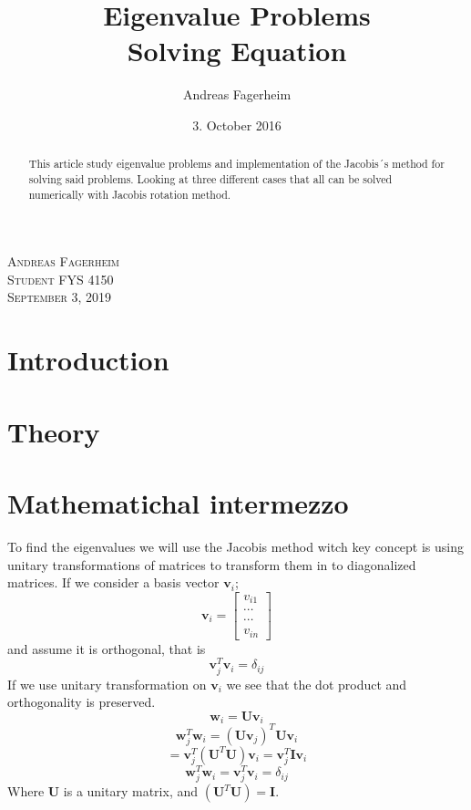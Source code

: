 \documentclass{article}
\title{Eigenvalue Problems \\
		Solving \SL Equation
		}
\author{Andreas Fagerheim}
\date{3. October 2016}
\begin{document}
\maketitle
	

\begin{abstract}
This article study eigenvalue problems and implementation of the Jacobis´s method for solving said problems. Looking at three different cases that all can be solved numerically with Jacobis rotation method.
\end{abstract}
\begin{flushright}
	\textsc{Andreas Fagerheim \\
	Student FYS 4150\\
	September 3, 2019}
	\end{flushright}

\cleardoublepage
\section{Introduction}



\section{Theory}\label{sec:theory}
\section{Mathematichal intermezzo}\label{sec:math}
To find the eigenvalues we will use the Jacobis method witch key concept is using unitary transformations of matrices to transform them in to diagonalized matrices. %
If we consider a basis vector $\mathbf{v}_i$;
$$\mathbf{v}_i = \begin{bmatrix}
					v_{i1} \\
					\cdots\\
					\cdots\\
					v_{in}
\end{bmatrix}
$$
and  assume it is orthogonal, that is
$$\mathbf{v}_j^T \mathbf{v}_i = \delta_{ij}$$
If we use unitary transformation on $\mathbf{v}_i$ we see that the dot product and orthogonality is preserved. 
$$
\mathbf{w}_i = \mathbf{U}\mathbf{v}_i
$$
$$
\mathbf{w}_j^T\mathbf{w}_i = (\mathbf{U}\mathbf{v}_j)^T \mathbf{U}\mathbf{v}_i
$$$$
= \mathbf{v}_j^T(\mathbf{U}^T \mathbf{U})\mathbf{v}_i = \mathbf{v}_j^T\mathbf{I}\mathbf{v}_i 
$$
$$
\mathbf{w}_j^T\mathbf{w}_i = \mathbf{v}_j^T\mathbf{v}_i = \delta_{ij}
$$
Where $\mathbf{U}$ is a unitary matrix, and $(\mathbf{U}^T \mathbf{U}) =\mathbf{I} $.
\end{document}
